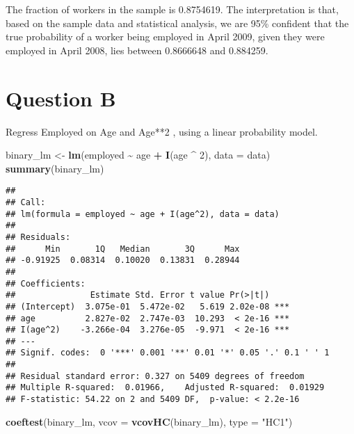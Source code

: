 \documentclass[
]{article}
\newenvironment{Shaded}{\begin{snugshade}}{\end{snugshade}}
\newcommand{\AttributeTok}[1]{\textcolor[rgb]{0.13,0.29,0.53}{#1}}
\newcommand{\DecValTok}[1]{\textcolor[rgb]{0.00,0.00,0.81}{#1}}
\newcommand{\FunctionTok}[1]{\textcolor[rgb]{0.13,0.29,0.53}{\textbf{#1}}}
\newcommand{\NormalTok}[1]{#1}
\newcommand{\OtherTok}[1]{\textcolor[rgb]{0.56,0.35,0.01}{#1}}
\newcommand{\SpecialCharTok}[1]{\textcolor[rgb]{0.81,0.36,0.00}{\textbf{#1}}}
\newcommand{\StringTok}[1]{\textcolor[rgb]{0.31,0.60,0.02}{#1}}
\begin{document}
The fraction of workers in the sample is 0.8754619. The interpretation
is that, based on the sample data and statistical analysis, we are 95\%
confident that the true probability of a worker being employed in April
2009, given they were employed in April 2008, lies between 0.8666648 and
0.884259.

\hypertarget{question-b}{%
\section{Question B}\label{question-b}}

Regress Employed on Age and Age**2 , using a linear probability model.

\begin{Shaded}
\begin{Highlighting}[]
\NormalTok{binary\_lm }\OtherTok{\textless{}{-}} \FunctionTok{lm}\NormalTok{(employed }\SpecialCharTok{\textasciitilde{}}\NormalTok{ age }\SpecialCharTok{+} \FunctionTok{I}\NormalTok{(age }\SpecialCharTok{\^{}} \DecValTok{2}\NormalTok{), }\AttributeTok{data =}\NormalTok{ data)}
\FunctionTok{summary}\NormalTok{(binary\_lm)}
\end{Highlighting}
\end{Shaded}

\begin{verbatim}
## 
## Call:
## lm(formula = employed ~ age + I(age^2), data = data)
## 
## Residuals:
##      Min       1Q   Median       3Q      Max 
## -0.91925  0.08314  0.10020  0.13831  0.28944 
## 
## Coefficients:
##               Estimate Std. Error t value Pr(>|t|)    
## (Intercept)  3.075e-01  5.472e-02   5.619 2.02e-08 ***
## age          2.827e-02  2.747e-03  10.293  < 2e-16 ***
## I(age^2)    -3.266e-04  3.276e-05  -9.971  < 2e-16 ***
## ---
## Signif. codes:  0 '***' 0.001 '**' 0.01 '*' 0.05 '.' 0.1 ' ' 1
## 
## Residual standard error: 0.327 on 5409 degrees of freedom
## Multiple R-squared:  0.01966,    Adjusted R-squared:  0.01929 
## F-statistic: 54.22 on 2 and 5409 DF,  p-value: < 2.2e-16
\end{verbatim}

\begin{Shaded}
\begin{Highlighting}[]
\FunctionTok{coeftest}\NormalTok{(binary\_lm, }\AttributeTok{vcov =} \FunctionTok{vcovHC}\NormalTok{(binary\_lm), }\AttributeTok{type =} \StringTok{"HC1"}\NormalTok{)}
\end{Highlighting}
\end{Shaded}
\end{document}
